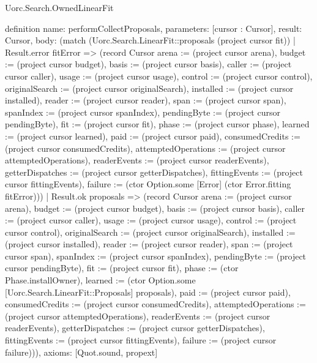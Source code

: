 \begin{lexlean}{Uorc.Search.OwnedLinearFit}
\begin{semanticmodule}
definition{
  name: performCollectProposals,
  parameters: [cursor : Cursor],
  result: Cursor,
  body: (match (Uorc.Search.LinearFit::proposals (project cursor fit))
    | Result.error fitError => (record Cursor {arena := (project cursor arena), budget := (project cursor budget), basis := (project cursor basis), caller := (project cursor caller), usage := (project cursor usage), control := (project cursor control), originalSearch := (project cursor originalSearch), installed := (project cursor installed), reader := (project cursor reader), span := (project cursor span), spanIndex := (project cursor spanIndex), pendingByte := (project cursor pendingByte), fit := (project cursor fit), phase := (project cursor phase), learned := (project cursor learned), paid := (project cursor paid), consumedCredits := (project cursor consumedCredits), attemptedOperations := (project cursor attemptedOperations), readerEvents := (project cursor readerEvents), getterDispatches := (project cursor getterDispatches), fittingEvents := (project cursor fittingEvents), failure := (ctor Option.some [Error] (ctor Error.fitting fitError))})
    | Result.ok proposals => (record Cursor {arena := (project cursor arena), budget := (project cursor budget), basis := (project cursor basis), caller := (project cursor caller), usage := (project cursor usage), control := (project cursor control), originalSearch := (project cursor originalSearch), installed := (project cursor installed), reader := (project cursor reader), span := (project cursor span), spanIndex := (project cursor spanIndex), pendingByte := (project cursor pendingByte), fit := (project cursor fit), phase := (ctor Phase.installOwner), learned := (ctor Option.some [Uorc.Search.LinearFit::Proposals] proposals), paid := (project cursor paid), consumedCredits := (project cursor consumedCredits), attemptedOperations := (project cursor attemptedOperations), readerEvents := (project cursor readerEvents), getterDispatches := (project cursor getterDispatches), fittingEvents := (project cursor fittingEvents), failure := (project cursor failure)})),
  axioms: [Quot.sound, propext]
}


\end{semanticmodule}
\end{lexlean}
